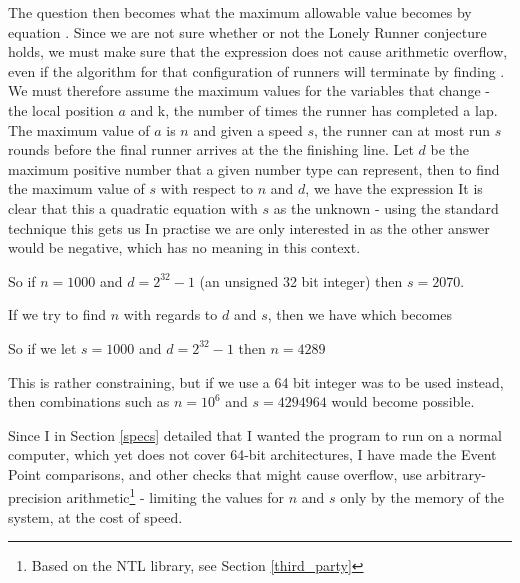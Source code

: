 The question then becomes what the maximum allowable value becomes by equation . Since we are not sure whether or not the Lonely Runner conjecture holds, we must make sure that the expression does not cause arithmetic overflow, even if the algorithm for that configuration of runners will terminate by finding \comFin. We must therefore assume the maximum values for the variables that change - the local position $a$ and k, the number of times the runner has completed a lap. The maximum value of $a$ is $n$ and given a speed $s$, the runner can at most run $s$ rounds before the final runner arrives at the the finishing line. Let $d$ be the maximum positive number that a given number type can represent, then to find the maximum value of $s$ with respect to $n$ and $d$, we have the expression 
It is clear that this a quadratic equation with $s$ as the unknown - using the standard technique this gets us
In practise we are only interested in
as the other answer would be negative, which has no meaning in this context.

So if $n = 1000$ and $d = 2^{32}-1$ (an unsigned 32 bit integer) then $s = 2070$.

If we try to find $n$ with regards to $d$ and $s$, then we have
which becomes

So if we let $s = 1000$ and $d = 2^{32}-1$ then $n = 4289$

This is rather constraining, but if we use a 64 bit integer was to be used instead, then combinations such as $n = 10^6$ and $s = 4294964$ would become possible.

Since I in Section \ref{specs} detailed that I wanted the program to run on a normal computer, which yet does not cover 64-bit architectures, I have made the Event Point comparisons, and other checks that might cause overflow, use arbitrary-precision arithmetic\footnote{Based on the NTL library, see Section \ref{third_party}} - limiting the values for $n$ and $s$ only by the memory of the system, at the cost of speed.

